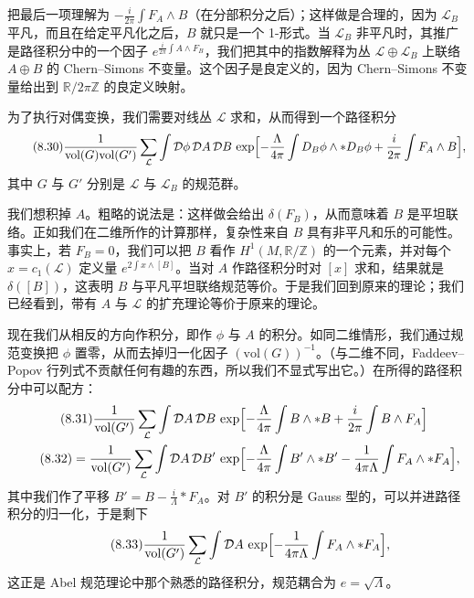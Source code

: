 把最后一项理解为 $-\frac{i}{2\pi}\int F_A\wedge B$（在分部积分之后）；这样做是合理的，因为 $\mathcal{L}_B$ 平凡，而且在给定平凡化之后，$B$ 就只是一个 1-形式。当 $\mathcal{L}_B$ 非平凡时，其推广是路径积分中的一个因子 $e^{\frac{i}{2\pi}\int A\wedge F_B}$，我们把其中的指数解释为丛 $\mathcal{L}\oplus\mathcal{L}_B$ 上联络 $A\oplus B$ 的 Chern–Simons 不变量。这个因子是良定义的，因为 Chern–Simons 不变量给出到 $\mathbb{R}/2\pi\mathbb{Z}$ 的良定义映射。

为了执行对偶变换，我们需要对线丛 $\mathcal{L}$ 求和，从而得到一个路径积分
\begin{equation}
  \tag{8.30}
  \label{eq:8-30}
  \frac{1}{\mathrm{vol}(G)\mathrm{vol}(G')}\sum_{\mathcal{L}}\int\mathcal{D}\phi\,\mathcal{D}A\,\mathcal{D}B\,
  \exp\Bigl[-\frac{\Lambda}{4\pi}\int D_B\phi\wedge\ast D_B\phi+\frac{i}{2\pi}\int F_A\wedge B\Bigr],
\end{equation}
其中 $G$ 与 $G'$ 分别是 $\mathcal{L}$ 与 $\mathcal{L}_B$ 的规范群。

我们想积掉 $A$。粗略的说法是：这样做会给出 $\delta(F_B)$，从而意味着 $B$ 是平坦联络。正如我们在二维所作的计算那样，复杂性来自 $B$ 具有非平凡和乐的可能性。事实上，若 $F_B=0$，我们可以把 $B$ 看作 $H^1(M,\mathbb{R}/\mathbb{Z})$ 的一个元素，并对每个 $x=c_1(\mathcal{L})$ 定义量 $e^{2\int x\wedge[B]}$。当对 $A$ 作路径积分时对 $[x]$ 求和，结果就是 $\delta([B])$，这表明 $B$ 与平凡平坦联络规范等价。于是我们回到原来的理论；我们已经看到，带有 $A$ 与 $\mathcal{L}$ 的扩充理论等价于原来的理论。

现在我们从相反的方向作积分，即作 $\phi$ 与 $A$ 的积分。如同二维情形，我们通过规范变换把 $\phi$ 置零，从而去掉归一化因子 $(\mathrm{vol}(G))^{-1}$。（与二维不同，Faddeev–Popov 行列式不贡献任何有趣的东西，所以我们不显式写出它。）在所得的路径积分中可以配方：
\begin{align}
  \tag{8.31}
  \label{eq:8-31}
  \frac{1}{\mathrm{vol}(G')}\sum_{\mathcal{L}}\int\mathcal{D}A\,\mathcal{D}B\,
  &\exp\Bigl[-\frac{\Lambda}{4\pi}\int B\wedge\ast B+\frac{i}{2\pi}\int B\wedge F_A\Bigr]\\
  \tag{8.32}
  \label{eq:8-32}
  =\frac{1}{\mathrm{vol}(G')}\sum_{\mathcal{L}}\int\mathcal{D}A\,\mathcal{D}B'\,
  &\exp\Bigl[-\frac{\Lambda}{4\pi}\int B'\wedge\ast B'-\frac{1}{4\pi\Lambda}\int F_A\wedge\ast F_A\Bigr],
\end{align}
其中我们作了平移 $B'=B-\frac{i}{\Lambda}\ast F_A$。对 $B'$ 的积分是 Gauss 型的，可以并进路径积分的归一化，于是剩下
\begin{equation}
  \tag{8.33}
  \label{eq:8-33}
  \frac{1}{\mathrm{vol}(G')}\sum_{\mathcal{L}}\int\mathcal{D}A\,\exp\Bigl[-\frac{1}{4\pi\Lambda}\int F_A\wedge\ast F_A\Bigr],
\end{equation}
这正是 Abel 规范理论中那个熟悉的路径积分，规范耦合为 $e=\sqrt{\Lambda}$。

